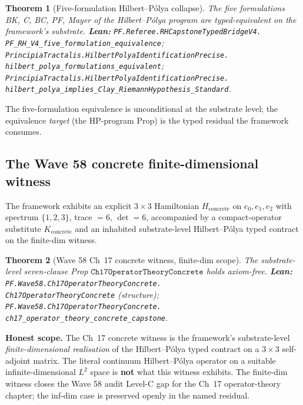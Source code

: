 \documentclass[11pt,a4paper]{article}
\theoremstyle{plain}
\newtheorem{theorem}{Theorem}[section]
\theoremstyle{definition}
\begin{document}
\begin{theorem}[Five-formulation Hilbert--P\'olya collapse]
\label{thm:hp-five}
The five formulations BK, C, BC, PF, Mayer of the Hilbert--P\'olya
program are typed-equivalent on the framework's substrate.
\textbf{Lean:}
\texttt{PF.Referee.RHCapstoneTypedBridgeV4.\\
PF\_RH\_V4\_five\_formulation\_equivalence};
\texttt{PrincipiaTractalis.HilbertPolyaIdentificationPrecise.\\
hilbert\_polya\_formulations\_equivalent};
\texttt{PrincipiaTractalis.HilbertPolyaIdentificationPrecise.\\
hilbert\_polya\_implies\_Clay\_RiemannHypothesis\_Standard}.
\end{theorem}

The five-formulation equivalence is unconditional at the substrate
level; the equivalence \emph{target} (the HP-program Prop) is the
typed residual the framework consumes.

\subsection{The Wave 58 concrete finite-dimensional witness}
\label{sec:concrete}

The framework exhibits an explicit $3 \times 3$ Hamiltonian
$H_{\mathrm{concrete}}$ on $e_{0}, e_{1}, e_{2}$ with spectrum
$\{1, 2, 3\}$, trace $= 6$, $\det = 6$, accompanied by a
compact-operator substitute $K_{\mathrm{concrete}}$ and an inhabited
substrate-level Hilbert--P\'olya typed contract on the finite-dim
witness.

\begin{theorem}[Wave 58 Ch~17 concrete witness, finite-dim scope]
\label{thm:ch17-concrete}
The substrate-level seven-clause Prop
$\mathtt{Ch17OperatorTheoryConcrete}$ holds axiom-free.
\textbf{Lean:}
\texttt{PF.Wave58.Ch17OperatorTheoryConcrete.\\
Ch17OperatorTheoryConcrete} (structure);
\texttt{PF.Wave58.Ch17OperatorTheoryConcrete.\\
ch17\_operator\_theory\_concrete\_capstone}.
\end{theorem}

\noindent\textbf{Honest scope.} The Ch~17 concrete witness is the
framework's substrate-level \emph{finite-dimensional realisation} of
the Hilbert--P\'olya typed contract on a $3\times 3$ self-adjoint
matrix. The literal continuum Hilbert--P\'olya operator on a
suitable infinite-dimensional $L^{2}$ space is \textbf{not} what this
witness exhibits. The finite-dim witness closes the Wave 58 audit
Level-C gap for the Ch~17 operator-theory chapter; the inf-dim case
is preserved openly in the named residual.
\end{document}
